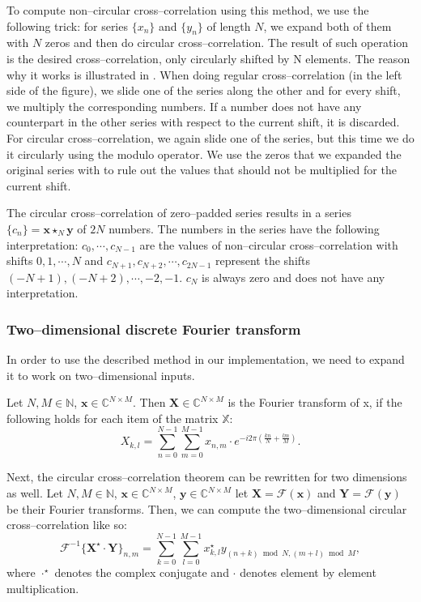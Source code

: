 To compute non--circular cross--correlation using this method, we use the following trick: for series $\{x_n\}$ and $\{y_n\}$ of length $N$, we expand both of them with $N$ zeros and then do circular cross--correlation. The result of such operation is the desired cross--correlation, only circularly shifted by N elements. The reason why it works is illustrated in . When doing regular cross--correlation (in the left side of the figure), we slide one of the series along the other and for every shift, we multiply the corresponding numbers. If a number does not have any counterpart in the other series with respect to the current shift, it is discarded. For circular cross--correlation, we again slide one of the series, but this time we do it circularly using the modulo operator. We use the zeros that we expanded the original series with to rule out the values that should not be multiplied for the current shift.

The circular cross--correlation of zero--padded series results in a series $\{c_n\} = \mathbf{x} \star_N \mathbf{y}$ of $2N$ numbers. The numbers in the series have the following interpretation: $c_0, \cdots, c_{N-1}$ are the values of non--circular cross--correlation with shifts $0, 1, \cdots, N$ and $c_{N+1}, c_{N+2}, \cdots, c_{2N-1}$ represent the shifts $(-N+1), (-N+2), \cdots, -2, -1$. $c_{N}$ is always zero and does not have any interpretation.

\subsubsection{Two--dimensional discrete Fourier transform}
\label{two-dim-ft}
In order to use the described method in our implementation, we need to expand it to work on two--dimensional inputs.

Let $N, M \in \mathbb{N}$, $\mathbf{x} \in \mathbb{C}^{N\times M}$. Then $\mathbf{X} \in \mathbb{C}^{N\times M}$ is the Fourier transform of x, if the following holds for each item of the matrix $\mathbb{X}$:
\[
X_{k,l} = \sum_{n=0}^{N-1} \sum_{m=0}^{M-1} x_{n,m} \cdot e^{-i2\pi(\frac{kn}{N} + \frac{lm}{M})}.
\]

Next, the circular cross--correlation theorem can be rewritten for two dimensions as well. Let $N, M \in \mathbb{N}$, $\mathbf{x} \in \mathbb{C}^{N\times M}$, $\mathbf{y} \in \mathbb{C}^{N\times M}$ let $\mathbf{X} = \mathcal{F}(\mathbf{x})$ and $\mathbf{Y} = \mathcal{F}(\mathbf{y})$ be their Fourier transforms. Then, we can compute the two--dimensional circular cross--correlation like so: 
\[
\mathcal{F}^{-1}\{\mathbf{X}^\star \cdot \mathbf{Y}\}_{n,m} = \sum_{k=0}^{N-1} \sum_{l=0}^{M-1} x^\star_{k,l} y_{(n+k)\bmod N, (m+l)\bmod M},
\]
where $\cdot^\star$ denotes the complex conjugate and $\cdot$ denotes element by element multiplication.

